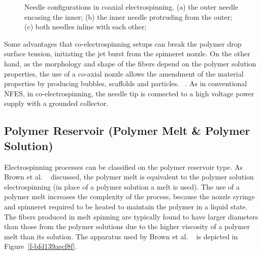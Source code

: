 \documentclass[5p,,preprint,12pt,twocolumn]{elsarticle}
\makeatletter
\def\fixFloatSize#1{}%
\makeatother
\begin{document}
\bgroup
\fixFloatSize{images/afe7da25-1366-4b1e-bf1a-0594eb2eaa88-uimg_nozzle.png}
\begin{figure}[!htbp]
\centering \makeatletter{}
\makeatother 
\caption{{Needle configurations in coaxial electrospinning. (a) the outer needle encasing the inner; (b) the inner needle protruding from the outer; (c) both needles inline with each other;}}
\label{f-4a5ffd16c3ab}
\end{figure}
\egroup
Some advantages that co-electrospinning setups can break the polymer drop surface tension, initiating the jet burst from the spinneret nozzle. On the other hand, as the morphology and shape of the fibers depend on the polymer solution properties, the use of a co-axial nozzle allows the amendment of the material properties by producing bubbles, scaffolds and particles. \unskip~\cite{527120:13914748,527120:13914750}. As in conventional NFES, in co-electrospinning, the needle tip is connected to a high voltage power supply with a grounded collector.



\subsection{Polymer Reservoir (Polymer Melt \& Polymer Solution)}Electrospinning processes can be classified on the polymer reservoir type. As Brown et al. \unskip~\cite{527120:13445499} discussed, the polymer melt is equivalent to the polymer solution electrospinning (in place of a polymer solution a melt is used). The use of a polymer melt increases the complexity of the process, because the nozzle syringe and spinneret required to be heated to maintain the polymer in a liquid state. The fibers produced in melt spinning are typically found to have larger diameters than those from the polymer solutions due to the higher viscosity of a polymer melt than its solution. The apparatus used by Brown et al. \unskip~\cite{527120:13445499} is depicted in Figure~\ref{f-bfd139aecf8f}.
\end{document}

